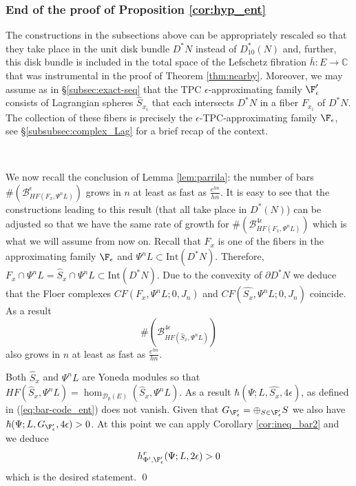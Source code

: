 \subsubsection{End of the proof of Proposition \ref{cor:hyp_ent}}\label{subsubsec:back_to_E} 
The constructions in the subsections above can be appropriately rescaled so  that they take place 
in the unit disk bundle $D^{\ast}N$ instead of $D^{\ast}_{10}(N)$ and, further, 
this disk bundle is included in the total space of  the Lefschetz  fibration $\bar{h}:E\to \mathbb{C}$ that was instrumental in the proof of Theorem \ref{thm:nearby}.
 Moreover, we may assume as in \S\ref{subsec:exact-seq} that the TPC $\epsilon$-approximating
 family $\F'_{\epsilon}$ consists of Lagrangian spheres $\hat{S}_{x_{i}}$ that each intersects 
 $D^{\ast}N$ in a fiber $F_{x_{i}}$ of $D^{\ast}N$. The collection of these fibers is precisely 
 the $\epsilon$-TPC-approximating family $\F_{\epsilon}$, see \S\ref{subsubsec:complex_Lag} for a brief
 recap of the context.
 
 \
 
We now recall the conclusion of  Lemma \ref{lem:parrila}: the number of bars $\# (\mathcal{B}^{\epsilon}_{HF(F_{x},\Psi^{n}L)})$ grows in $n$ at least as fast as  $\frac{e^{hn}}{hn}$. It is easy to see that the constructions leading to this result (that all take place in $D^{\ast}(N)$) can be adjusted so  that we have the same rate of growth for  $\# (\mathcal{B}^{4\epsilon}_{HF(F_{x},\Psi^{n}L)})$ which is what we will assume from now on.
Recall that $F_{x}$ is one of the fibers in the approximating family $\F_{\epsilon}$ and $\Psi^{n}L\subset  \mathrm{Int}(D^{\ast}N)$. 
Therefore, $F_{x}\cap \Psi^{n}L= \hat{S}_{x}\cap \Psi^{n}L \subset \mathrm{Int}(D^{\ast}N)$.  Due to the convexity of $\partial D^{\ast}N$ we deduce that the Floer complexes $CF(F_{x}, \Psi^{n}L;0, J_{n})$ and $CF(\hat{S_{x}}, \Psi^{n}L;0,J_{n})$ coincide. 
As a result 
$$\# (\mathcal{B}^{4\epsilon}_{HF(\hat{S}_{x},\Psi^{n}L)})$$  also grows in $n$ at least 
as fast as  $\frac{e^{hn}}{hn}$.

Both $\hat{S}_{x}$ and $\Psi^{n}L$ are Yoneda modules so that
$HF(\hat{S}_{x},\Psi^{n}L)=\hom_{\mathscr{D}_{p}(E)}(\hat{S}_{x},\Psi^{n}L)$. 
As a result $\hbar  (\Psi; L, \hat{S_{x}}, 4\epsilon)$, as defined in  (\ref{eq:bar-code_ent}) does not vanish. Given that $G_{\F'_{\epsilon}}=\oplus_{S\in \F'_{\epsilon}}S$
we also have $\hbar (\Psi; L, G_{\F'_{\epsilon}},4\epsilon)>0$.
At this point we can apply Corollary \ref{cor:ineq_bar2}
 and we deduce 
 $$ h^{r}_{\Phi',\F'_{\epsilon}}(\Psi; L,2\epsilon)>0$$
 which is the desired statement. \qed
 


 